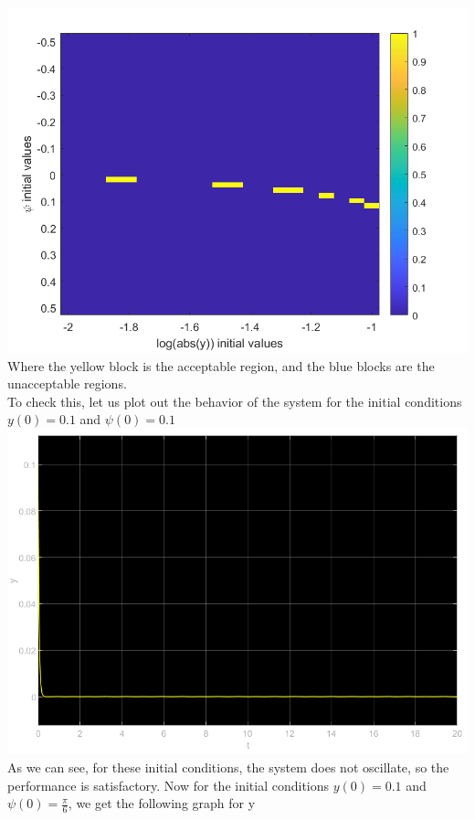 \documentclass[12pt]{article}
\begin{document}
\includegraphics[scale=0.4]{Problem3Fig1.png}\\
Where the yellow block is the acceptable region, and the blue blocks are the unacceptable regions.\\
To check this, let us plot out the behavior of the system for the initial conditions $y(0)=0.1$ and $\psi(0)=0.1$\\
\includegraphics[scale=0.4]{Problem3Fig2.png}\\
As we can see, for these initial conditions, the system does not oscillate, so the performance is satisfactory. 
Now for the initial conditions $y(0)=0.1$ and $\psi(0)=\frac{\pi}{6}$, we get the following graph for y\\
\end{document}
